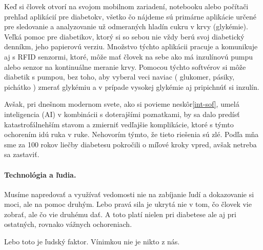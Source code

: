 Keď si človek otvorí na svojom mobilnom zariadení, notebooku alebo počítači prehľad aplikácií pre diabetokv, všetko čo nájdeme sú primárne aplikácie určené pre sledovanie a analyzovanie už odmeraných hladín cukru v krvy (glykémie).
Veľká pomoc pre diabetikov, ktorý si so sebou nie vždy berú svoj diabetický denníkm, jeho papierovú verziu. Množstvo týchto aplikácii pracuje a komunikuje aj s RFID senzormi, ktoré, môže mať človek na sebe ako má inzulínovú pumpu alebo senzor na kontinuálne meranie krvy. 
Pomocou týchto softvérov si môže diabetik s pumpou, bez toho, aby vyberal veci naviac ( glukomer, pásiky, pichátko ) zmerať glykémiu a v prípade vysokej glykémie aj pripichnúť si inzulín.

Avšak, pri dnešnom modernom svete, ako si povieme neskôr\ref{int-sof}, umelá inteligencia (AI) v kombinácii s doterajšími poznatkami, by sa dalo predísť katastrofálnehším stavom a zmierniť vedľajšie komplikácie, ktoré s týmto ochorením idú ruka v ruke.
Nehovorím týmto, že tieto riešenia sú zlé. Podľa mňa sme za 100 rokov liečby diabetesu pokročili o míľové kroky vpred, avšak netreba sa zastaviť. 
\paragraph{Technológia a ľudia.}
Musíme napredovať a využívať vedomosti nie na zabíjanie ľudí a dokazovanie si moci, ale na pomoc druhým. 
Lebo pravá sila je ukrytá nie v tom, čo človek vie zobrať, ale čo vie druhému dať. A toto platí nielen pri diabetese ale aj pri ostatných, rovnako vážnych ochoreniach. 

Lebo toto je ľudský faktor. Vínimkou nie je nikto z nás. 